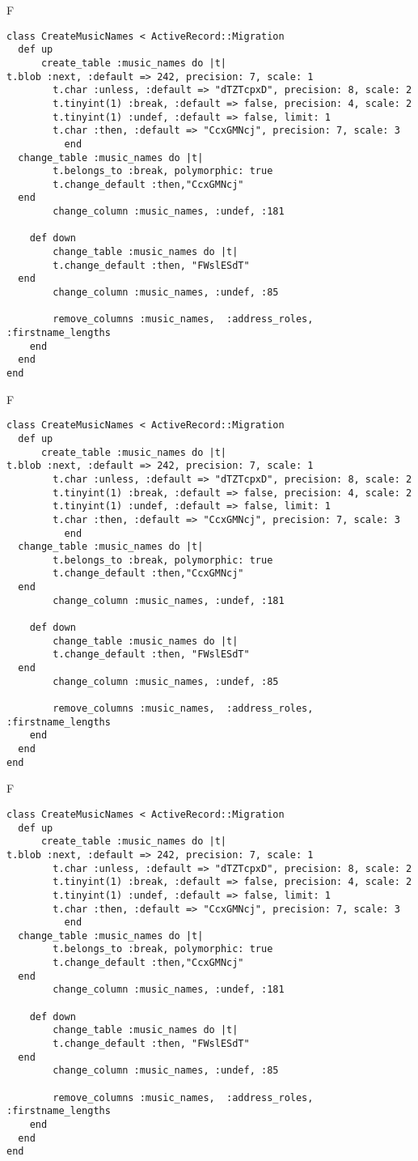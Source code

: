 F
\begin{verbatim}
class CreateMusicNames < ActiveRecord::Migration
  def up
	  create_table :music_names do |t|
t.blob :next, :default => 242, precision: 7, scale: 1
		t.char :unless, :default => "dTZTcpxD", precision: 8, scale: 2
		t.tinyint(1) :break, :default => false, precision: 4, scale: 2
		t.tinyint(1) :undef, :default => false, limit: 1
		t.char :then, :default => "CcxGMNcj", precision: 7, scale: 3
		  end
  change_table :music_names do |t|
		t.belongs_to :break, polymorphic: true
 		t.change_default :then,"CcxGMNcj"
  end
 		change_column :music_names, :undef, :181
   
	def down
		change_table :music_names do |t|
		t.change_default :then, "FWslESdT"
  end
 		change_column :music_names, :undef, :85
   
		remove_columns :music_names,  :address_roles, :firstname_lengths 
    end 
  end
end

\end{verbatim}

F
\begin{verbatim}
class CreateMusicNames < ActiveRecord::Migration
  def up
	  create_table :music_names do |t|
t.blob :next, :default => 242, precision: 7, scale: 1
		t.char :unless, :default => "dTZTcpxD", precision: 8, scale: 2
		t.tinyint(1) :break, :default => false, precision: 4, scale: 2
		t.tinyint(1) :undef, :default => false, limit: 1
		t.char :then, :default => "CcxGMNcj", precision: 7, scale: 3
		  end
  change_table :music_names do |t|
		t.belongs_to :break, polymorphic: true
 		t.change_default :then,"CcxGMNcj"
  end
 		change_column :music_names, :undef, :181
   
	def down
		change_table :music_names do |t|
		t.change_default :then, "FWslESdT"
  end
 		change_column :music_names, :undef, :85
   
		remove_columns :music_names,  :address_roles, :firstname_lengths 
    end 
  end
end

\end{verbatim}

F
\begin{verbatim}
class CreateMusicNames < ActiveRecord::Migration
  def up
	  create_table :music_names do |t|
t.blob :next, :default => 242, precision: 7, scale: 1
		t.char :unless, :default => "dTZTcpxD", precision: 8, scale: 2
		t.tinyint(1) :break, :default => false, precision: 4, scale: 2
		t.tinyint(1) :undef, :default => false, limit: 1
		t.char :then, :default => "CcxGMNcj", precision: 7, scale: 3
		  end
  change_table :music_names do |t|
		t.belongs_to :break, polymorphic: true
 		t.change_default :then,"CcxGMNcj"
  end
 		change_column :music_names, :undef, :181
   
	def down
		change_table :music_names do |t|
		t.change_default :then, "FWslESdT"
  end
 		change_column :music_names, :undef, :85
   
		remove_columns :music_names,  :address_roles, :firstname_lengths 
    end 
  end
end

\end{verbatim}

